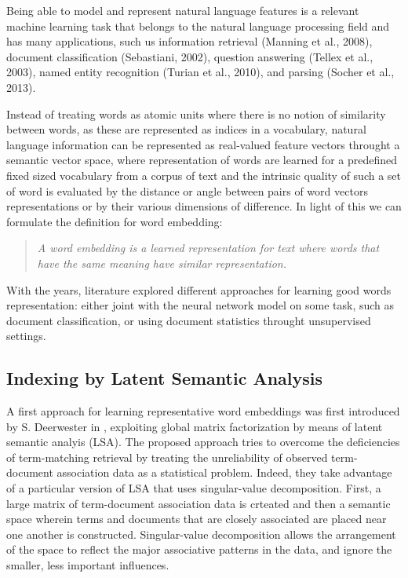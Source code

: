 Being able to model and represent natural language features is a
relevant machine learning task that belongs to the natural language
processing field and has many applications, such us information
retrieval (Manning et al., 2008), document classification (Sebastiani,
2002), question answering (Tellex et al., 2003), named entity
recognition (Turian et al., 2010), and parsing (Socher et al., 2013).

Instead of treating words as atomic units where there is no notion of
similarity between words, as these are represented as indices in a
vocabulary, natural language information can be represented as
real-valued feature vectors throught a semantic vector space, where
representation of words are learned for a predefined fixed sized
vocabulary from a corpus of text and the intrinsic quality of such a
set of word is evaluated by the distance or angle between pairs of
word vectors representations or by their various dimensions of
difference. In light of this we
can formulate the definition for word embedding: 

\begin{quote}
    \textit{A word embedding is a learned representation for text
    where words that have the same meaning have similar
    representation.}
\end{quote}

With the years, literature explored different approaches for learning
good words representation: either joint with the neural network model
on some task, such as document classification, or using document
statistics throught unsupervised settings.

\subsection{Indexing by Latent Semantic Analysis}

A first approach for learning representative word embeddings was first
introduced by S. Deerwester \etal{} in , exploiting global matrix factorization by means of latent
semantic analyis (LSA). The proposed approach tries to overcome the
deficiencies of term-matching retrieval by treating the unreliability
of observed term-document association data as a statistical problem.
Indeed, they take advantage of a particular version of LSA that uses
singular-value decomposition. First, a large matrix of term-document
association data is crteated and then a semantic space wherein terms
and documents that are closely associated are placed near one another
is constructed. Singular-value decomposition allows the arrangement of
the space to reflect the major associative patterns in the data, and
ignore the smaller, less important influences.

